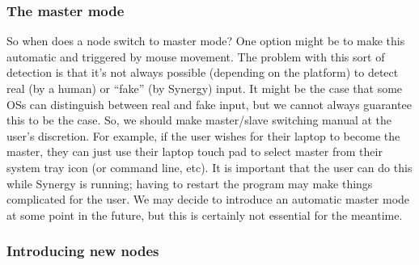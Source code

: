 \subsubsection{The master mode}

So when does a node switch to master mode? One option might be to make this
automatic and triggered by mouse movement. The problem with this sort of
detection is that it's not always possible (depending on the platform) to
detect real (by a human) or ``fake'' (by Synergy) input. It might be the
case that some OSs can distinguish between real and fake input, but we cannot
always guarantee this to be the case. So, we should make master/slave switching
manual at the user's discretion. For example, if the user wishes for their
laptop to become the master, they can just use their laptop touch pad to
select master from their system tray icon (or command line, etc). It is
important that the user can do this while Synergy is running; having to restart
the program may make things complicated for the user. We may decide to 
introduce an automatic master mode at some point in the future, but this is
certainly not essential for the meantime.

\subsubsection{Introducing new nodes}


